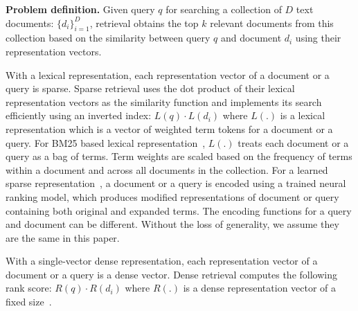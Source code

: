 \textbf{Problem definition.}
Given query $q$ for searching a collection of $D$ text documents:   $ \{d_i\}^D_{i=1}$, 
retrieval  obtains the top $k$ relevant documents from this collection based on
the similarity between query $q$ and document  $d_i$ using  their
representation vectors.

With a lexical representation, each  representation vector of a document or a query is sparse.
Sparse retrieval uses  the dot product of their lexical representation vectors as the similarity function
and implements its search efficiently using an inverted index: 
$L(q) \cdot  L(d_i)$
where $L(.)$ is a lexical representation   which is a vector of weighted term tokens for a document or a query.
For BM25 based lexical representation~\cite{Robertson2009BM25}, 
$L(.)$ treats each document or a query as a bag of terms.
Term weights are scaled based on the frequency of terms within a document and across all documents in the collection.
For a learned sparse representation~\cite{Dai2020deepct, Mallia2021deepimpact, Lin2021unicoil,2021NAACL-Gao-COIL}, 
a document or a query is encoded using  a trained neural ranking model, which
produces modified representations of document or query containing both original and expanded terms.
The encoding functions for a query and document can be different. Without the loss of generality, we assume they are the same in this paper.

With a single-vector dense  representation, each  representation vector of a document or a query is a dense vector. 
Dense retrieval computes the following rank score: 
$R(q) \cdot  R(d_i)$
where $R(.)$ is a dense representation vector  of a fixed size~\cite{Karpukhin2020DPR}.


